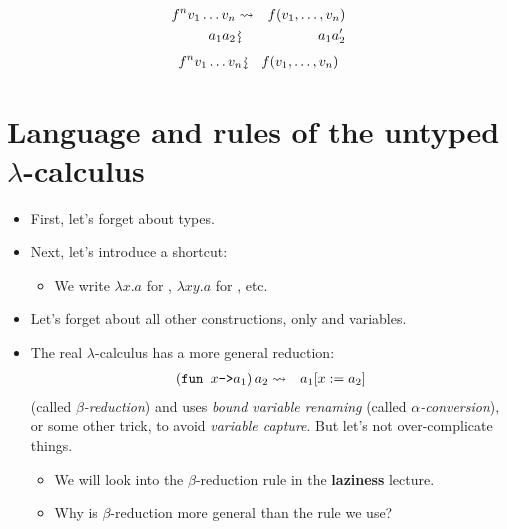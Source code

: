 \documentclass{beamer}
\newcommand{\assign}{:=}
\newcommand{\downsquigarrow}{{\mbox{\rotatebox[origin=c]{-90}{$\rightsquigarrow$}}}}
\newcommand{\tmem}[1]{{\em #1\/}}
\newcommand{\tmstrong}[1]{\textbf{#1}}
\newcommand{\tmverbatim}[1]{\text{{\ttfamily{#1}}}}
\begin{document}
{\hlstd{ \ }}{}{\hlopt{+ }}{\hlopt{(}}{}{\hlopt{+
}}{}{\hlopt{)}}
\begin{eqnarray*}
  f^n v_1 \ldots v_n & \rightsquigarrow & f (v_1, \ldots, v_n)\\
  a_1 a_2 & \downsquigarrow & a_1 a_2'
\end{eqnarray*}
{\hlstd{ \ }}{}{\hlopt{+ }}{}
\begin{eqnarray*}
  f^n v_1 \ldots v_n & \downsquigarrow & f (v_1, \ldots, v_n)
\end{eqnarray*}
{\hlstd{ \ }}{}{\newpage}

\section{Language and rules of the untyped $\lambda$-calculus}

\begin{itemize}
  \item First, let's forget about types.
  
  \item Next, let's introduce a shortcut:
  \begin{itemize}
    \item We write $\lambda x.a$ for \tmverbatim{fun $x$->$a$}, $\lambda x
    y.a$ for \tmverbatim{fun $x$ $y$->$a$}, etc.
  \end{itemize}
  \item Let's forget about all other constructions, only {} and
  variables.
  
  \item The real $\lambda$-calculus has a more general reduction:
  \begin{eqnarray*}
    \left( \text{\tmverbatim{fun }} x \text{\tmverbatim{->}} a_1 \right) a_2 &
    \rightsquigarrow & a_1 [x \assign a_2]
  \end{eqnarray*}
  (called {\tmem{$\beta$-reduction}}) and uses {\tmem{bound variable
  renaming}} (called {\tmem{$\alpha$-conversion}}), or some other trick, to
  avoid {\tmem{variable capture}}. But let's not over-complicate things.
  \begin{itemize}
    \item We will look into the $\beta$-reduction rule in the
    {\tmstrong{laziness}} lecture.
    
    \item Why is $\beta$-reduction more general than the rule we use?
  \end{itemize}
\end{itemize}
\end{document}
